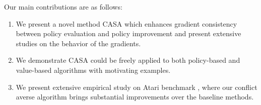 Our main contributions are as follows:
\begin{enumerate}[label=(\roman*),leftmargin=*]
\item We present a novel method CASA which { enhances gradient consistency} between policy evaluation and policy improvement and present extensive studies on the behavior of the gradients.
\item We demonstrate CASA could be freely applied to both policy-based and value-based algorithms with motivating examples.
\item We present extensive empirical study on Atari benchmark , where our conflict averse algorithm brings substantial improvements over the baseline methods. 
\end{enumerate}
